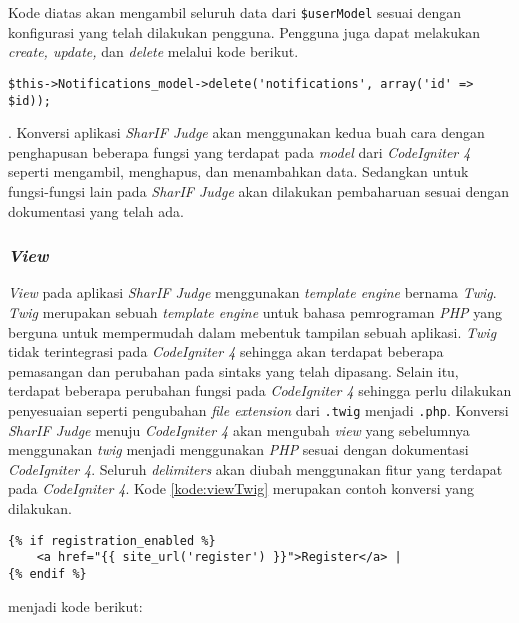 Kode diatas akan mengambil seluruh data dari \verb|$userModel| sesuai dengan konfigurasi yang telah dilakukan pengguna. Pengguna juga dapat melakukan \textit{create, update,} dan \textit{delete} melalui kode berikut.

\begin{lstlisting}[caption=Contoh kode untuk menghapus data pada model, label=kode:modelCI4Delete]
$this->Notifications_model->delete('notifications', array('id' => $id));

\end{lstlisting}

. Konversi aplikasi \textit{SharIF Judge} akan menggunakan kedua buah cara dengan penghapusan beberapa fungsi yang terdapat pada \textit{model} dari \textit{CodeIgniter 4} seperti mengambil, menghapus, dan menambahkan data. Sedangkan untuk fungsi-fungsi lain pada \textit{SharIF Judge} akan dilakukan pembaharuan sesuai dengan dokumentasi yang telah ada.

\subsubsection{\textit{View}}
\textit{View} pada aplikasi \textit{SharIF Judge} menggunakan \textit{template engine} bernama \textit{Twig}. \textit{Twig} merupakan sebuah \textit{template engine} untuk bahasa pemrograman \textit{PHP} yang berguna untuk mempermudah dalam mebentuk tampilan sebuah aplikasi. \textit{Twig} tidak terintegrasi pada \textit{CodeIgniter 4} sehingga akan terdapat beberapa pemasangan dan perubahan pada sintaks yang telah dipasang. Selain itu, terdapat beberapa perubahan fungsi pada \textit{CodeIgniter 4} sehingga perlu dilakukan penyesuaian seperti pengubahan \textit{file extension} dari \texttt{.twig} menjadi \texttt{.php}. Konversi \textit{SharIF Judge} menuju \textit{CodeIgniter 4} akan mengubah \textit{view} yang sebelumnya menggunakan \textit{twig} menjadi menggunakan \textit{PHP} sesuai dengan dokumentasi \textit{CodeIgniter 4}. Seluruh \textit{delimiters} akan diubah menggunakan fitur yang terdapat pada \textit{CodeIgniter 4}. Kode \ref{kode:viewTwig} merupakan contoh konversi yang dilakukan.

\begin{lstlisting}[caption=Contoh \textit{view} menggunakan \textit{twig}, label=kode:viewTwig]
{% if registration_enabled %}
	<a href="{{ site_url('register') }}">Register</a> |
{% endif %}
\end{lstlisting}

menjadi kode berikut:

